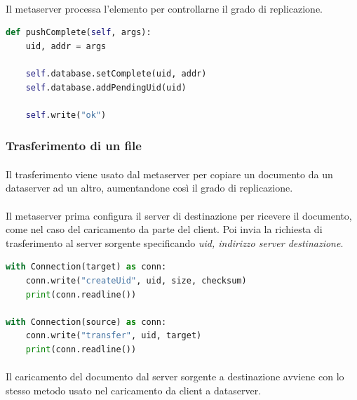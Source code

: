 \documentclass{article}
\begin{document}
\paragraph{} Il metaserver processa l'elemento per controllarne il grado di replicazione.

\begin{lstlisting}[language=Python, title=Metaserver]
def pushComplete(self, args):
    uid, addr = args

    self.database.setComplete(uid, addr)
    self.database.addPendingUid(uid)

    self.write("ok")
\end{lstlisting}


\subsubsection{Trasferimento di un file}

\paragraph{} Il trasferimento viene usato dal metaserver per copiare un documento da un dataserver ad un altro, aumentandone così il grado di replicazione.

\paragraph{} Il metaserver prima configura il server di destinazione per ricevere il documento, come nel caso del caricamento da parte del client. Poi invia la richiesta di trasferimento al server sorgente specificando \emph{uid, indirizzo server destinazione}.

\begin{lstlisting}[language=Python, title=Metaserver]
with Connection(target) as conn:
    conn.write("createUid", uid, size, checksum)
    print(conn.readline())

with Connection(source) as conn:
    conn.write("transfer", uid, target)
    print(conn.readline())
\end{lstlisting}

\paragraph{} Il caricamento del documento dal server sorgente a destinazione avviene con lo stesso metodo usato nel caricamento da client a dataserver.
\end{document}

